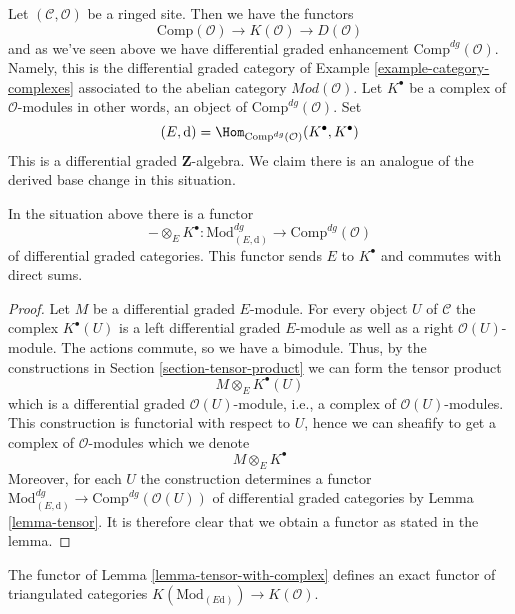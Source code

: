 \noindent
Let $(\mathcal{C}, \mathcal{O})$ be a ringed site. Then we have the functors
$$
\text{Comp}(\mathcal{O}) \to K(\mathcal{O}) \to D(\mathcal{O})
$$
and as we've seen above we have differential graded enhancement
$\text{Comp}^{dg}(\mathcal{O})$. Namely, this is the differential
graded category of Example \ref{example-category-complexes} associated
to the abelian category $\textit{Mod}(\mathcal{O})$.
Let $K^\bullet$ be a complex of $\mathcal{O}$-modules in other
words, an object of $\text{Comp}^{dg}(\mathcal{O})$. Set
$$
(E, \text{d}) =
\Hom_{\text{Comp}^{dg}(\mathcal{O})}(K^\bullet, K^\bullet)
$$
This is a differential graded $\mathbf{Z}$-algebra. We claim there is
an analogue of the derived base change in this situation.

\begin{lemma}
\label{lemma-tensor-with-complex}
In the situation above there is a functor
$$
- \otimes_E K^\bullet :
\text{Mod}^{dg}_{(E, \text{d})}
\longrightarrow
\text{Comp}^{dg}(\mathcal{O})
$$
of differential graded categories. This functor sends $E$ to $K^\bullet$
and commutes with direct sums.
\end{lemma}

\begin{proof}
Let $M$ be a differential graded $E$-module. For every object $U$ of
$\mathcal{C}$ the complex $K^\bullet(U)$ is a left differential
graded $E$-module as well as a right $\mathcal{O}(U)$-module.
The actions commute, so we have a bimodule.
Thus, by the constructions in Section \ref{section-tensor-product}
we can form the tensor product
$$
M \otimes_E K^\bullet(U)
$$
which is a differential graded $\mathcal{O}(U)$-module, i.e., a complex
of $\mathcal{O}(U)$-modules. This construction is functorial with respect
to $U$, hence we can sheafify to get a complex of $\mathcal{O}$-modules
which we denote
$$
M \otimes_E K^\bullet
$$
Moreover, for each $U$ the construction determines a functor
$\text{Mod}^{dg}_{(E, \text{d})} \to \text{Comp}^{dg}(\mathcal{O}(U))$
of differential graded categories by Lemma \ref{lemma-tensor}.
It is therefore clear that we obtain a functor as stated in the lemma.
\end{proof}

\begin{lemma}
\label{lemma-tensor-with-complex-homotopy}
The functor of Lemma \ref{lemma-tensor-with-complex} defines an exact functor
of triangulated categories
$K(\text{Mod}_{(E \text{d})}) \to K(\mathcal{O})$.
\end{lemma}

